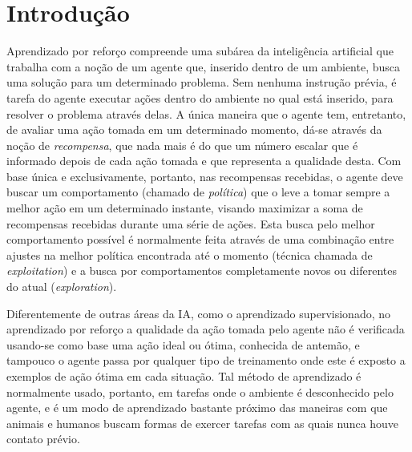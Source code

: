 \documentclass[cic,tc]{iiufrgs}
\begin{document}

\tableofcontents

\chapter{Introdução}
Aprendizado por reforço compreende uma subárea da inteligência artificial que
trabalha com a noção de um agente que, inserido dentro de um ambiente, busca uma
solução para um determinado problema. Sem nenhuma instrução prévia, é tarefa do
agente executar ações dentro do ambiente no qual está inserido, para resolver
o problema através delas. A única maneira que o agente tem, entretanto, de
avaliar uma ação tomada em um determinado momento, dá-se através da noção de
\textit{recompensa}, que nada mais é do que um número escalar que é informado
depois de cada ação tomada e que representa a qualidade desta. Com base única e
exclusivamente, portanto, nas
recompensas recebidas, o agente deve buscar um comportamento (chamado de
\textit{política}) que o leve a tomar sempre a melhor ação em um determinado
instante, visando maximizar a soma de recompensas recebidas durante uma série
de ações. Esta busca pelo melhor comportamento possível é normalmente feita
através de uma combinação entre ajustes na melhor política encontrada até o
momento (técnica chamada de \textit{exploitation}) e a busca por comportamentos
completamente novos ou diferentes do atual (\textit{exploration}).


Diferentemente de outras áreas da IA, como o aprendizado supervisionado, no
aprendizado por reforço a qualidade da ação tomada pelo agente não é verificada
usando-se como base uma ação ideal ou ótima, conhecida de antemão, e tampouco o
agente passa por qualquer tipo de treinamento onde este é exposto a exemplos de
ação ótima em cada situação. Tal método de aprendizado é normalmente usado,
portanto, em tarefas onde o ambiente é desconhecido pelo agente, e é um modo de
aprendizado bastante próximo das maneiras com que animais e humanos buscam
formas de exercer tarefas com as quais nunca houve contato prévio.
\end{document}
